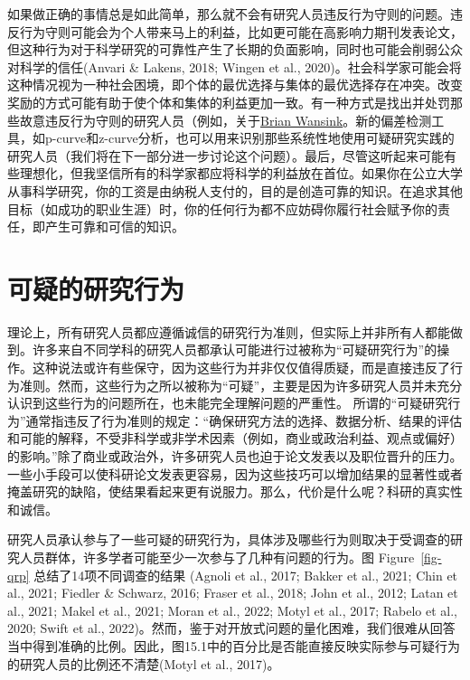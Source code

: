 \documentclass[
  letterpaper,
  DIV=11,
  numbers=noendperiod]{scrreprt}
\begin{document}
如果做正确的事情总是如此简单，那么就不会有研究人员违反行为守则的问题。违反行为守则可能会为个人带来马上的利益，比如更可能在高影响力期刊发表论文，但这种行为对于科学研究的可靠性产生了长期的负面影响，同时也可能会削弱公众对科学的信任(Anvari
\& Lakens, 2018; Wingen et al.,
2020)。社会科学家可能会将这种情况视为一种社会困境，即个体的最优选择与集体的最优选择存在冲突。改变奖励的方式可能有助于使个体和集体的利益更加一致。有一种方式是找出并处罚那些故意违反行为守则的研究人员（例如，关于\href{https://www.vox.com/science-and-health/2018/9/19/17879102/brian-wansink-cornell-food-brand-lab-retractions-jama}{Brian
Wansink}。新的偏差检测工具，如p-curve和z-curve分析，也可以用来识别那些系统性地使用可疑研究实践的研究人员（我们将在下一部分进一步讨论这个问题）。最后，尽管这听起来可能有些理想化，但我坚信所有的科学家都应将科学的利益放在首位。如果你在公立大学从事科学研究，你的工资是由纳税人支付的，目的是创造可靠的知识。在追求其他目标（如成功的职业生涯）时，你的任何行为都不应妨碍你履行社会赋予你的责任，即产生可靠和可信的知识。

\hypertarget{sec-QRP}{%
\section{可疑的研究行为}\label{sec-QRP}}

理论上，所有研究人员都应遵循诚信的研究行为准则，但实际上并非所有人都能做到。许多来自不同学科的研究人员都承认可能进行过被称为``可疑研究行为''的操作。这种说法或许有些保守，因为这些行为并非仅仅值得质疑，而是直接违反了行为准则。然而，这些行为之所以被称为``可疑''，主要是因为许多研究人员并未充分认识到这些行为的问题所在，也未能完全理解问题的严重性。
所谓的``可疑研究行为''通常指违反了行为准则的规定：``确保研究方法的选择、数据分析、结果的评估和可能的解释，不受非科学或非学术因素（例如，商业或政治利益、观点或偏好）的影响。''除了商业或政治外，许多研究人员也迫于论文发表以及职位晋升的压力。一些小手段可以使科研论文发表更容易，因为这些技巧可以增加结果的显著性或者掩盖研究的缺陷，使结果看起来更有说服力。那么，代价是什么呢？科研的真实性和诚信。

研究人员承认参与了一些可疑的研究行为，具体涉及哪些行为则取决于受调查的研究人员群体，许多学者可能至少一次参与了几种有问题的行为。图
Figure~\ref{fig-qrp} 总结了14项不同调查的结果 (Agnoli et al., 2017;
Bakker et al., 2021; Chin et al., 2021; Fiedler \& Schwarz, 2016; Fraser
et al., 2018; John et al., 2012; Latan et al., 2021; Makel et al., 2021;
Moran et al., 2022; Motyl et al., 2017; Rabelo et al., 2020; Swift et
al.,
2022)。然而，鉴于对开放式问题的量化困难，我们很难从回答当中得到准确的比例。因此，图15.1中的百分比是否能直接反映实际参与可疑行为的研究人员的比例还不清楚(Motyl
et al., 2017)。
\end{document}
